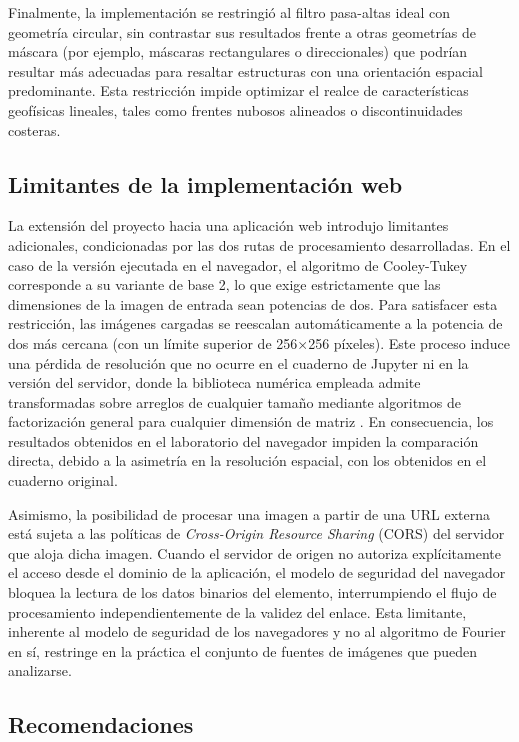 \documentclass[conference]{IEEEtran}
\begin{document}
Finalmente, la implementación se restringió al filtro
pasa-altas ideal con geometría circular, sin contrastar sus resultados frente a otras geometrías de máscara (por ejemplo, máscaras rectangulares o
direccionales) que podrían resultar más adecuadas para resaltar estructuras
con una orientación espacial predominante. Esta restricción impide optimizar el realce de características geofísicas lineales, tales como frentes nubosos alineados o discontinuidades costeras.

\subsection{Limitantes de la implementación web}

La extensión del proyecto hacia una aplicación web introdujo limitantes
adicionales, condicionadas por las dos rutas de procesamiento desarrolladas. En el caso de la versión ejecutada en el navegador, el
algoritmo de Cooley-Tukey corresponde a su variante de base 2, lo que exige estrictamente que las dimensiones de la imagen de entrada sean potencias de dos. Para satisfacer esta restricción, las imágenes cargadas se reescalan automáticamente a la potencia de dos más cercana (con un límite superior de 256×256 píxeles). Este proceso induce una pérdida de resolución que no ocurre en el cuaderno de Jupyter ni en la versión del servidor, donde la
biblioteca numérica empleada admite transformadas sobre arreglos de
cualquier tamaño mediante algoritmos de factorización general para cualquier dimensión de matriz
\cite{numpyfft}. En consecuencia, los resultados obtenidos en el laboratorio
del navegador impiden la comparación directa, debido a la asimetría en la resolución espacial, con los obtenidos en el cuaderno original.

Asimismo, la posibilidad de procesar una imagen a partir de una URL externa
está sujeta a las políticas de \textit{Cross-Origin Resource Sharing} (CORS)
del servidor que aloja dicha imagen. Cuando el servidor de origen no autoriza explícitamente el acceso desde el dominio de la aplicación, el modelo de seguridad del navegador bloquea la lectura de los datos binarios del elemento, interrumpiendo el flujo de procesamiento independientemente de la validez del enlace. Esta limitante,
inherente al modelo de seguridad de los navegadores y no al algoritmo de
Fourier en sí, restringe en la práctica el conjunto de fuentes de imágenes que
pueden analizarse.

\subsection{Recomendaciones}
 
\end{document}
